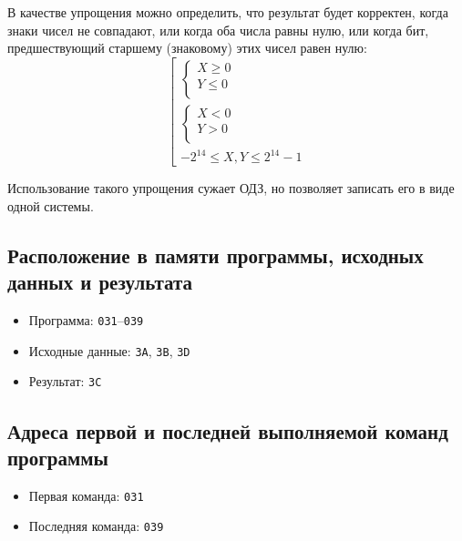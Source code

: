 \documentclass[11pt,a4paper]{article}
\begin{document}
В качестве упрощения можно определить, что результат будет корректен, когда знаки чисел не совпадают, или когда оба числа равны нулю, или когда бит, предшествующий старшему (знаковому) этих чисел  равен нулю:
\begin{equation}
\left[
\begin{gathered}
\begin{cases}
X \geqslant 0\\
Y\leqslant 0\\
\end{cases}\\
\begin{cases}
X < 0\\
Y> 0\\
\end{cases}\\
-2^{14} \leqslant X, Y \leqslant 2^{14} - 1
\end{gathered}
\right.
\end{equation}

Использование такого упрощения сужает ОДЗ, но позволяет записать его в виде одной системы.
\subsection{Расположение в памяти программы, исходных данных и результата}
\begin{itemize}
	\item Программа: \texttt{031}--\texttt{039}
	\item Исходные данные: \texttt{3A}, \texttt{3B}, \texttt{3D}
	\item Результат: \texttt{3С}
\end{itemize}
\subsection{Адреса первой и последней выполняемой команд программы}
\begin{itemize}
	\item Первая команда: \texttt{031}
	\item Последняя команда: \texttt{039}
\end{itemize}
\end{document}
